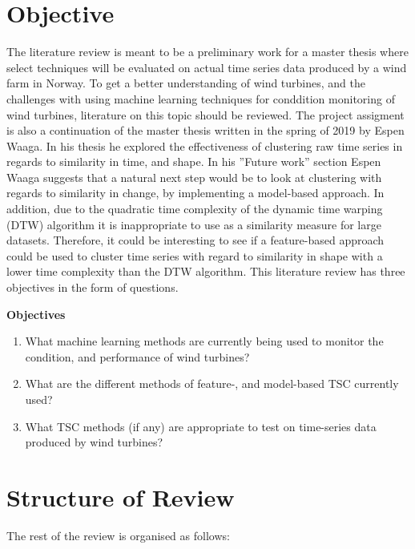 \section{Objective} \label{sec:objective}

The literature review is meant to be a preliminary work for a master thesis where select techniques will be evaluated on actual time series data produced by a wind farm in Norway. 
To get a better understanding of wind turbines, and the challenges with using machine learning techniques for conddition monitoring of wind turbines, literature on this topic should be reviewed.  
The project assigment is also a continuation of the master thesis written in the spring of 2019 by Espen Waaga. 
In his thesis he explored the effectiveness of clustering raw time series in regards to similarity in time, and shape. 
In his ''Future work'' section Espen Waaga suggests that a natural next step would be to look at clustering with regards to similarity in change, by implementing a model-based approach. 
In addition, due to the quadratic time complexity of the dynamic time warping (DTW) algorithm it is inappropriate to use as a similarity measure for large datasets. 
Therefore, it could be interesting to see if a feature-based approach could be used to cluster time series with regard to similarity in shape with a lower time complexity than the DTW algorithm. 
This literature review has three objectives in the form of questions. \bigskip

\begin{tcolorbox}
    \textbf{Objectives}

    \begin{enumerate}
        \item What machine learning methods are currently being used to monitor the condition, and performance of wind turbines?
        \item What are the different methods of feature-, and model-based TSC currently used?
        \item What TSC methods (if any) are appropriate to test on time-series data produced by wind turbines? 
    \end{enumerate}
\end{tcolorbox}

\section{Structure of Review}
The rest of the review is organised as follows:

